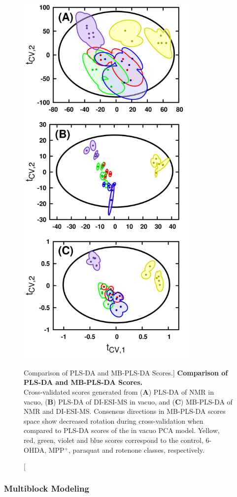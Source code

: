 \begin{figure}
\includegraphics[width=3.5in]{figs/apps/10-mbpls-t.png}
\caption
      [Comparison of PLS-DA and MB-PLS-DA Scores.]{
  {\bf Comparison of PLS-DA and MB-PLS-DA Scores.}
  \\
  Cross-validated scores generated from ({\bf A}) PLS-DA of \hnmr{} NMR in
  vacuo, ({\bf B}) PLS-DA of DI-ESI-MS in vacuo, and ({\bf C}) MB-PLS-DA of
  \hnmr{} NMR and DI-ESI-MS. Consensus directions in MB-PLS-DA scores space
  show decreased rotation during cross-validation when compared to PLS-DA
  scores of the in vacuo PCA model. Yellow, red, green, violet and blue scores
  correspond to the control, 6-OHDA, MPP$^+$, paraquat and rotenone classes,
  respectively.
}
\label{figure.4.10}
\end{figure}

\subsubsection{Multiblock Modeling}

